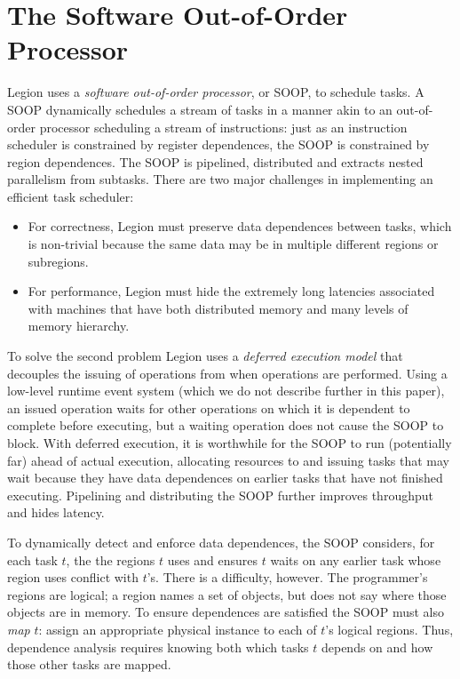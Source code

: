 \section{The Software Out-of-Order Processor}
\label{sec:soop}

Legion uses a {\em  software out-of-order processor}, or SOOP, to schedule tasks.  A SOOP 
dynamically schedules a stream of tasks in a manner akin to an out-of-order processor scheduling a stream of instructions:
just as an instruction scheduler is constrained by register dependences,
the SOOP is constrained by region dependences.
The SOOP  is pipelined, distributed and extracts nested parallelism from subtasks.
There are two major challenges in implementing an efficient task scheduler:
\begin{itemize}
\item  For correctness, Legion must preserve data dependences between tasks, which is non-trivial
because the same data may be in multiple different regions or subregions.
  
\item For performance, Legion must hide the extremely long latencies associated
  with machines that have both distributed memory and many levels of
  memory hierarchy.
\end{itemize}

To solve the second problem Legion uses a {\em deferred execution model} that decouples the issuing
of operations from when operations are performed.  Using a low-level runtime event system (which we do
not describe further in this paper), an issued operation waits for other operations on
which it is dependent to complete before executing, but a waiting operation does not cause the SOOP
to block.  With deferred execution, it is worthwhile for the SOOP to run (potentially far) ahead of actual execution,
allocating resources to and issuing tasks that may wait because they have data dependences on earlier tasks that have not 
finished executing.   Pipelining and distributing the SOOP further improves throughput and hides latency.

To dynamically detect and enforce data dependences,
the SOOP considers, for each task $t$, the
the regions $t$ uses and ensures $t$ waits on any
earlier task whose region uses conflict with $t$'s.  There is a
difficulty, however.  The programmer's regions are logical; a region
names a set of objects, but does not say where those objects
are in memory.  To ensure dependences are satisfied the SOOP must also {\em map} $t$: assign an
appropriate physical instance to each of $t$'s logical regions.  Thus, dependence
analysis requires knowing both which tasks $t$ depends on and how those
other tasks are mapped.

